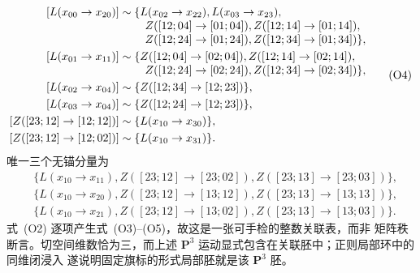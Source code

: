 \[
\begin{aligned}
[L(x_{00}\to x_{20})]&\sim
\{L(x_{02}\to x_{22}),L(x_{03}\to x_{23}),\\[-1mm]
&\hspace{8mm} Z([12;04]\to[01;04]),Z([12;14]\to[01;14]),\\[-1mm]
&\hspace{8mm} Z([12;24]\to[01;24]),Z([12;34]\to[01;34])\},\\
[L(x_{01}\to x_{11})]&\sim
\{Z([12;04]\to[02;04]),Z([12;14]\to[02;14]),\\[-1mm]
&\hspace{8mm} Z([12;24]\to[02;24]),Z([12;34]\to[02;34])\},\\
[L(x_{02}\to x_{04})]&\sim\{Z([12;34]\to[12;23])\},\\
[L(x_{03}\to x_{04})]&\sim\{Z([12;24]\to[12;23])\},\\
[Z([23;12]\to[12;12])]&\sim\{L(x_{10}\to x_{30})\},\\
[Z([23;12]\to[12;02])]&\sim\{L(x_{10}\to x_{31})\}.
\end{aligned}                                                 \tag{O4}
\]
唯一三个无锚分量为
\[
\begin{aligned}
&\{L(x_{10}\to x_{11}),Z([23;12]\to[23;02]),
                         Z([23;13]\to[23;03])\},\\
&\{L(x_{10}\to x_{20}),Z([23;12]\to[13;12]),
                         Z([23;13]\to[13;13])\},\\
&\{L(x_{10}\to x_{21}),Z([23;12]\to[13;02]),
                         Z([23;13]\to[13;03])\}.
\end{aligned}                                                 \tag{O5}
\]
式~(O2) 逐项产生式~(O3)--(O5)，故这是一张可手检的整数关联表，而非
矩阵秩断言。切空间维数恰为三，而上述
\(\mathbf P^3\) 运动显式包含在关联胚中；正则局部环中的同维闭浸入
遂说明固定旗标的形式局部胚就是该 \(\mathbf P^3\) 胚。


